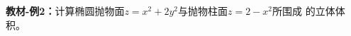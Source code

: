 \begin{center}
\end{center}

{\bf 教材-例2：}计算椭圆抛物面$z=x^2+2y^2$与抛物柱面$z=2-x^2$所围成
的立体体积。

\begin{center}
\end{center}

